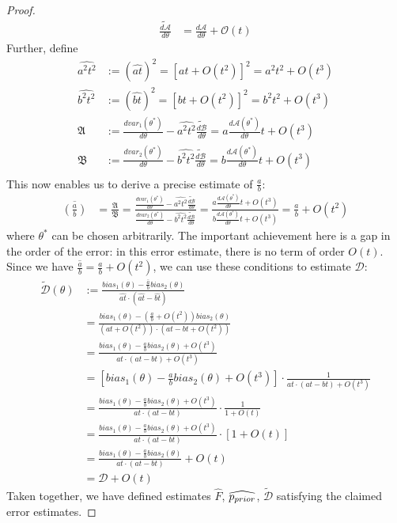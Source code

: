 \begin{proof}
\begin{align*}
    \tilde{\frac{d \mathcal{A}}{d \theta}} &= \frac{d \mathcal{A}}{d \theta} + \mathcal{O}(t)
    \end{align*}
    Further, define
    \begin{align*}
    \widehat{a^2t^2} &:= \left(\widehat{at}\right)^2 = \left[at + O(t^2)\right]^2 = a^2t^2 + O(t^3) \\
    \widehat{b^2t^2} &:= \left(\widehat{bt}\right)^2 = \left[bt + O(t^2)\right]^2 = b^2t^2 + O(t^3) \\
    \mathfrak{A} &:= \frac{d var_1(\theta^*)}{d \theta} - \widehat{a^2t^2} \tilde{\frac{d \mathcal{B}}{d \theta}} = a\frac{d \mathcal{A}(\theta^*)}{d \theta}t + O(t^3) \\
    \mathfrak{B} &:= \frac{d var_2(\theta^*)}{d \theta} - \widehat{b^2t^2} \tilde{\frac{d \mathcal{B}}{d \theta}} = b\frac{d \mathcal{A}(\theta^*)}{d \theta}t + O(t^3)\\
    \end{align*}    
    This now enables us to derive a precise estimate of $\frac{a}{b}$:
    \begin{align*}
    \overline{(\frac{a}{b})} &= \frac{\mathfrak{A}}{\mathfrak{B}} = \frac{\frac{d var_1(\theta^*)}{d \theta} - \widehat{a^2t^2} \tilde{\frac{d \mathcal{B}}{d \theta}}}{\frac{d var_2(\theta^*)}{d \theta} - \widehat{b^2t^2} \tilde{\frac{d \mathcal{B}}{d \theta}}} = \frac{a\frac{d \mathcal{A}(\theta^*)}{d \theta}t + O(t^3)}{b\frac{d \mathcal{A}(\theta^*)}{d \theta}t + O(t^3)} = \frac{a}{b}+O(t^2)
\end{align*}
where  $\theta^*$ can be chosen arbitrarily. %
The important achievement here is a gap in the order of the error: in this error estimate, there is no term of order $O(t)$.
Since we have $\overline{\frac{a}{b}} = \frac{a}{b} + O(t^2)$, we can use these conditions to estimate $\mathcal{D}$:
\begin{align*}
    \tilde{\mathcal{D}}(\theta) &:= \frac{bias_1(\theta) - \overline{\frac{a}{b}}bias_2(\theta)}{\widehat{at} \cdot (\widehat{at} - \widehat{bt})}\\
    &= \frac{bias_1(\theta) - (\frac{a}{b} + O(t^2))bias_2(\theta)}{(at+O(t^2)) \cdot (at - bt + O(t^2))}\\
    &= \frac{bias_1(\theta) - \frac{a}{b}bias_2(\theta) + O(t^3)}{at \cdot (at - bt) + O(t^3)}\\
    &= [bias_1(\theta) - \frac{a}{b}bias_2(\theta) + O(t^3)] \cdot \frac{1}{at \cdot (at - bt) + O(t^3)}\\
    &=\frac{bias_1(\theta) - \frac{a}{b}bias_2(\theta) + O(t^3)}{at \cdot (at - bt)} \cdot \frac{1}{1 + O(t)}\\
    &= \frac{bias_1(\theta) - \frac{a}{b}bias_2(\theta) + O(t^3)}{at \cdot (at - bt)} \cdot [1+O(t)]\\
    &= \frac{bias_1(\theta) - \frac{a}{b}bias_2(\theta)}{at \cdot (at - bt)} + O(t)\\
    &= \mathcal{D} + O(t)
\end{align*}
Taken together, we have defined estimates $\widehat{F}$, $\widehat{p_{prior}}$, $\tilde{\mathcal{D}}$ satisfying the claimed error estimates.
\end{proof}


